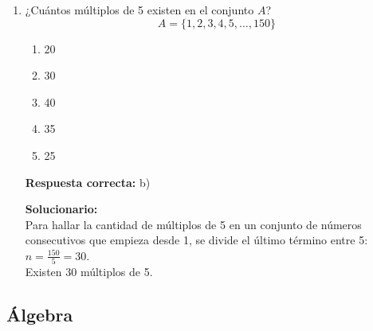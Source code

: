 \begin{enumerate}
	\vspace{2mm}
	\textbf{Solucionario:}\\
	Ha invertido: $48 \times 2 = 96.00$ soles. \\
	Como desea ganar 48 soles, entonces la mezcla se debe vender en $96 + 48 = 144.00$ soles a razón de 2.40 soles el litro.\\
	Luego:\\
	1 litro se vende a 2.40 soles\\
	$x$ litros se vende a 144 soles\\
	$\Rightarrow x = \frac{(144)(1)}{2.4} = 60$ litros.\\
	Debe adicionar: $60 - 48 = 12$ litros.
	
	\vspace{6mm}
	
	\item ¿Cuántos múltiplos de 5 existen en el conjunto $A$?
	\[ A = \{1, 2, 3, 4, 5, \dots, 150\} \]
	
	\begin{enumerate}[label=\alph*)]
		\item 20
		\item 30
		\item 40
		\item 35
		\item 25
	\end{enumerate}
	\textbf{Respuesta correcta:} b)
	
	\vspace{2mm}
	\textbf{Solucionario:}\\
	Para hallar la cantidad de múltiplos de 5 en un conjunto de números consecutivos que empieza desde 1, se divide el último término entre 5:\\
	$n = \frac{150}{5} = 30$.\\
	Existen 30 múltiplos de 5.
	
	\vspace{6mm}
	
\end{enumerate}


\subsection*{Álgebra}

